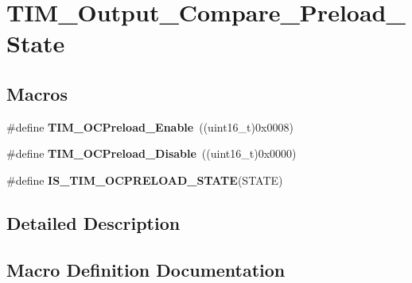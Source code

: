 \hypertarget{group___t_i_m___output___compare___preload___state}{}\section{T\+I\+M\+\_\+\+Output\+\_\+\+Compare\+\_\+\+Preload\+\_\+\+State}
\label{group___t_i_m___output___compare___preload___state}
\subsection*{Macros}
\begin{DoxyCompactItemize}
\item 
\hypertarget{group___t_i_m___output___compare___preload___state_gad647db2e7a89bd6db3c787680afccf8f}{}\#define {\bfseries T\+I\+M\+\_\+\+O\+C\+Preload\+\_\+\+Enable}~((uint16\+\_\+t)0x0008)\label{group___t_i_m___output___compare___preload___state_gad647db2e7a89bd6db3c787680afccf8f}

\item 
\hypertarget{group___t_i_m___output___compare___preload___state_ga0cbcc3c4d90d61d85550db2173737ed6}{}\#define {\bfseries T\+I\+M\+\_\+\+O\+C\+Preload\+\_\+\+Disable}~((uint16\+\_\+t)0x0000)\label{group___t_i_m___output___compare___preload___state_ga0cbcc3c4d90d61d85550db2173737ed6}

\item 
\#define {\bfseries I\+S\+\_\+\+T\+I\+M\+\_\+\+O\+C\+P\+R\+E\+L\+O\+A\+D\+\_\+\+S\+T\+A\+T\+E}(S\+T\+A\+T\+E)
\end{DoxyCompactItemize}


\subsection{Detailed Description}


\subsection{Macro Definition Documentation}
\hypertarget{group___t_i_m___output___compare___preload___state_ga48cc07c5e87b5fd7549b7668f1598ab5}{}
